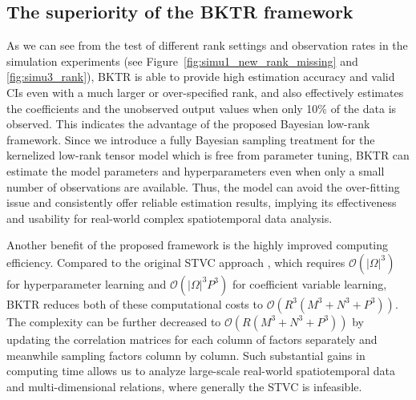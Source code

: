\documentclass[12pt]{article}
\begin{document}




\subsection{The superiority of the BKTR framework}


As we can see from the test of different rank settings and observation rates in the simulation experiments (see Figure~\ref{fig:simu1_new_rank_missing} and \ref{fig:simu3_rank}), BKTR is able to provide high estimation accuracy and valid CIs even with a much larger or over-specified rank, and also effectively estimates the coefficients and the unobserved output values when only 10\% of the data is observed. This indicates the advantage of the proposed Bayesian low-rank framework. Since we introduce a fully Bayesian sampling treatment for the kernelized low-rank tensor model which is free from parameter tuning, BKTR can estimate the model parameters and hyperparameters even when only a small number of observations are available. Thus, the model can avoid the over-fitting issue and consistently offer reliable estimation results, implying its effectiveness and usability for real-world complex spatiotemporal data analysis.


Another benefit of the proposed framework is the highly improved computing efficiency. Compared to the original STVC approach \citep{gelfand2003spatial}, which requires $\mathcal{O}\left(|\Omega|^3\right)$ for hyperparameter learning and $\mathcal{O}\left(|\Omega|^3P^3\right)$ for coefficient variable learning, BKTR reduces both of these computational costs to $\mathcal{O}\left(R^3\left(M^3+N^3+P^3\right)\right)$. The complexity can be further decreased to $\mathcal{O}\left(R\left(M^3+N^3+P^3\right)\right)$ by updating the correlation matrices for each column of factors separately and meanwhile sampling factors column by column. Such substantial gains in computing time allows us to analyze large-scale real-world spatiotemporal data and multi-dimensional relations, where generally the STVC is infeasible. 
\end{document}

